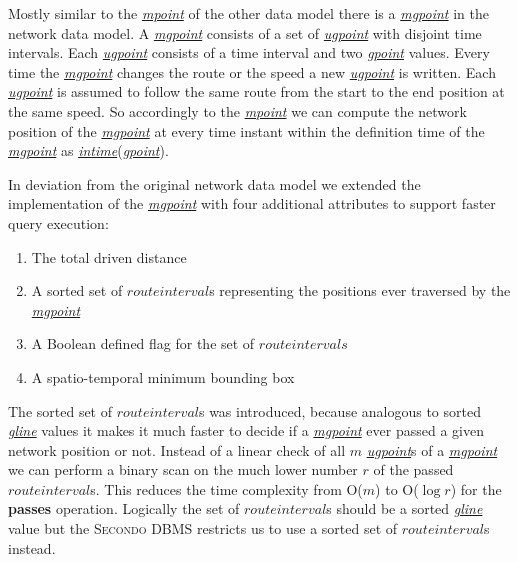 \documentclass[a4paper]{article}
\newcommand{\secondo}{\textsc{Secondo}}
\newcommand{\op}[1]{\textbf{#1}}
\newcommand{\dt}[1]{\textsl{\underline{#1}}}
\begin{document}
{Mostly similar to the \dt{mpoint} of the other data model there is a
\dt{mgpoint} in the network data model. A \dt{mgpoint} consists of a set of
\dt{ugpoint} with disjoint time intervals. Each \dt{ugpoint} consists of a time
interval and two \dt{gpoint} values. Every time the \dt{mgpoint} changes the route
or the speed a new \dt{ugpoint} is written. Each \dt{ugpoint} is assumed to follow
the same route from the start to the end position at the same speed. So accordingly
to the \dt{mpoint} we can compute the network position of the \dt{mgpoint} at every
time instant within the definition time of the \dt{mgpoint} as \dt{intime}(\dt{gpoint}).

In deviation from the original network data model we extended the implementation
of the \dt{mgpoint} with four additional attributes to support faster query execution:
\begin{enumerate}
	\item The total driven distance
	\item A sorted set of $route interval$s representing the positions ever
traversed by the \dt{mgpoint}
	\item A Boolean defined flag for the set of $route intervals$
	\item A spatio-temporal minimum bounding box
\end{enumerate}
The sorted set of $route interval$s was introduced, because analogous to sorted
\dt{gline} values it makes it much faster to decide if a \dt{mgpoint} ever passed
a given network position or not. Instead of a linear check of all $m$ \dt{ugpoint}s
of a \dt{mgpoint} we can perform a binary scan on the much lower number $r$ of the passed $route interval$s.
This reduces the time complexity from O($m$) to O($\log r$) for the \op{passes}
operation. Logically the set of $route interval$s should be a sorted \dt{gline}
value but the \secondo{} DBMS restricts us to use a sorted set of $route interval$s
instead.

}
\end{document}
